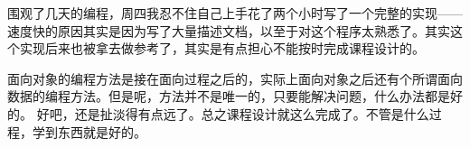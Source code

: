 围观了几天的编程，周四我忍不住自己上手花了两个小时写了一个完整的实现——速度快的原因其实是因为写了大量描述文档，以至于对这个程序太熟悉了。其实这个实现后来也被拿去做参考了，其实是有点担心不能按时完成课程设计的。

面向对象的编程方法是接在面向过程之后的，实际上面向对象之后还有个所谓面向数据的编程方法。但是呢，方法并不是唯一的，只要能解决问题，什么办法都是好的。
好吧，还是扯淡得有点远了。总之课程设计就这么完成了。不管是什么过程，学到东西就是好的。

